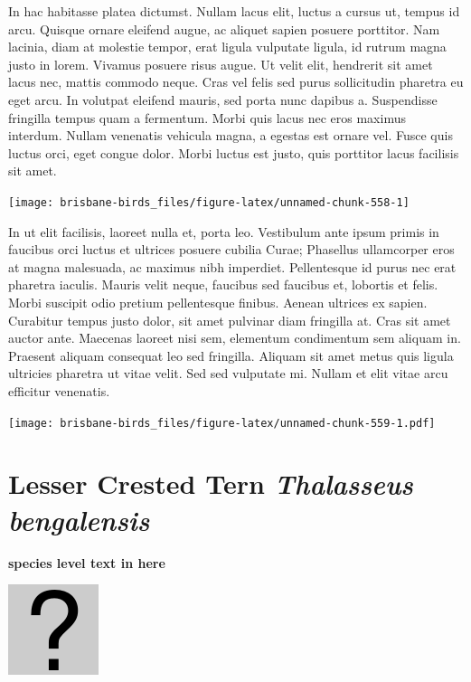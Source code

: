 \documentclass[]{book}
\let\origfigure\figure
\let\endorigfigure\endfigure
\renewenvironment{figure}[1][2] {
  \expandafter\origfigure\expandafter[H]
} {
  \endorigfigure
}
\begin{document}
In hac habitasse platea dictumst. Nullam lacus elit, luctus a cursus ut,
tempus id arcu. Quisque ornare eleifend augue, ac aliquet sapien posuere
porttitor. Nam lacinia, diam at molestie tempor, erat ligula vulputate
ligula, id rutrum magna justo in lorem. Vivamus posuere risus augue. Ut
velit elit, hendrerit sit amet lacus nec, mattis commodo neque. Cras vel
felis sed purus sollicitudin pharetra eu eget arcu. In volutpat eleifend
mauris, sed porta nunc dapibus a. Suspendisse fringilla tempus quam a
fermentum. Morbi quis lacus nec eros maximus interdum. Nullam venenatis
vehicula magna, a egestas est ornare vel. Fusce quis luctus orci, eget
congue dolor. Morbi luctus est justo, quis porttitor lacus facilisis sit
amet.

\begin{figure}
\texttt{[image: brisbane-birds\_files/figure-latex/unnamed-chunk-558-1]} \caption{insert figure caption}\label{fig:unnamed-chunk-558}
\end{figure}

In ut elit facilisis, laoreet nulla et, porta leo. Vestibulum ante ipsum
primis in faucibus orci luctus et ultrices posuere cubilia Curae;
Phasellus ullamcorper eros at magna malesuada, ac maximus nibh
imperdiet. Pellentesque id purus nec erat pharetra iaculis. Mauris velit
neque, faucibus sed faucibus et, lobortis et felis. Morbi suscipit odio
pretium pellentesque finibus. Aenean ultrices ex sapien. Curabitur
tempus justo dolor, sit amet pulvinar diam fringilla at. Cras sit amet
auctor ante. Maecenas laoreet nisi sem, elementum condimentum sem
aliquam in. Praesent aliquam consequat leo sed fringilla. Aliquam sit
amet metus quis ligula ultricies pharetra ut vitae velit. Sed sed
vulputate mi. Nullam et elit vitae arcu efficitur venenatis.

\begin{figure}
\centering
\texttt{[image: brisbane-birds\_files/figure-latex/unnamed-chunk-559-1.pdf]}
\caption{\label{fig:unnamed-chunk-559}insert figure caption}
\end{figure}

\section{\texorpdfstring{Lesser Crested Tern \emph{Thalasseus
bengalensis}}{Lesser Crested Tern Thalasseus bengalensis}}\label{lesser-crested-tern-thalasseus-bengalensis}

\textbf{species level text in here}

\begin{figure}
\centering
\includegraphics{assets/missing.png}
\caption{No image for species}
\end{figure}
\end{document}
